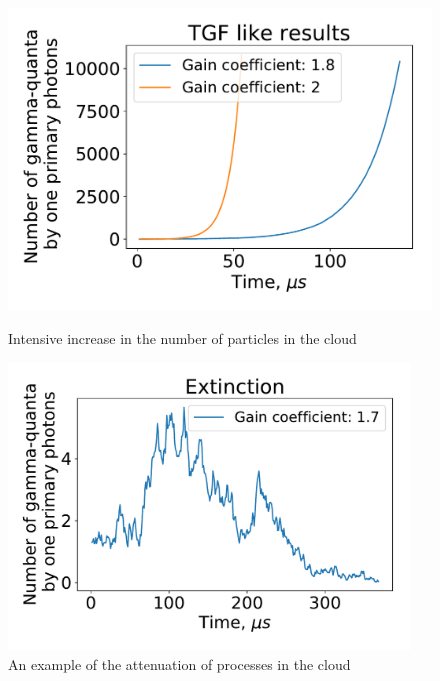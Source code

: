 \documentclass[%
 aip,
cp,  %
 amsmath,amssymb,%
 reprint,%
]{revtex4-2}
\begin{document}
\begin{figure}[ht!]
\begin{minipage}[t]{0.45\textwidth}
		\includegraphics[width=0.95\linewidth]{figures/proofTGF.pdf}
		\caption{
		Intensive increase in the number of particles in the cloud
		}
		\label{pic-tgf-a}
\end{minipage}\hfill%
\begin{minipage}[t]{0.45\textwidth}
		\includegraphics[width=0.95\textwidth]{figures/Extinction.pdf}
		\caption{
		An example of the attenuation of processes in the cloud
		}
		\label{pic-ext-b}
\end{minipage}
\end{figure}
\end{document}

